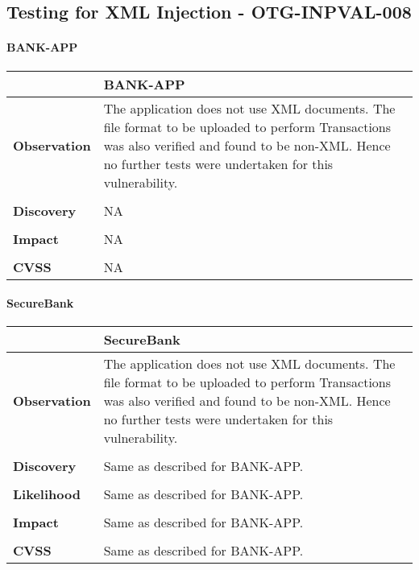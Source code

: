 \subsection{Testing for XML Injection - OTG-INPVAL-008}
\paragraph{BANK-APP} \mbox{}
\begin{longtable*}{p{.20\textwidth} | p{.80\textwidth}}
    \hline
    & \textbf{BANK-APP} \\
    \hline
    \textbf{Observation} &
      The application does not use XML documents. The file format to be uploaded to perform  Transactions was also verified and found to be non-XML. Hence no further tests were undertaken for this vulnerability.
    \\\\
    \textbf{Discovery} &
        NA
    \\\\
    \textbf{Impact} &
        NA
    \\\\
    \textbf{CVSS} &
       NA
    \\
    \hline
\end{longtable*}
\paragraph{SecureBank} \mbox{}
\begin{longtable*}{p{.20\textwidth} | p{.80\textwidth}}
    \hline
    & \textbf{SecureBank} \\
    \hline
    \textbf{Observation} &
        The application does not use XML documents. The file format to be uploaded to perform  Transactions was also verified and found to be non-XML. Hence no further tests were undertaken for this vulnerability.
    \\\\
    \textbf{Discovery} &
    	Same as described for BANK-APP.
    \\\\
    \textbf{Likelihood} &
        Same as described for BANK-APP.
    \\\\
    \textbf{Impact} &
        Same as described for BANK-APP.
    \\\\
    \textbf{CVSS} &
        Same as described for BANK-APP.
    \\
    \hline
\end{longtable*}
\clearpage